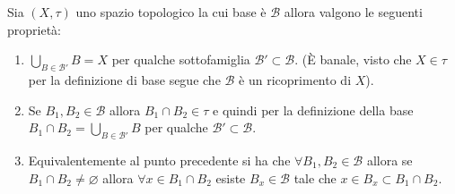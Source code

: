 \begin{remark}
	Sia $(X, \tau)$ uno spazio topologico la cui base è $\mathcal{B}$ allora valgono le seguenti proprietà:
	\begin{enumerate}
		\item $\bigcup_{B \in \mathcal{B}'} B = X$ per qualche sottofamiglia $\mathcal{B}' \subset \mathcal{B}$. (È banale, visto che $X \in \tau$ per la definizione di base segue che $\mathcal{B}$ è un ricoprimento di $X$).
		\item Se $B_1, B_2 \in \mathcal{B}$ allora $B_1 \cap B_2 \in \tau$ e quindi per la definizione della base $B_1 \cap B_2  = \bigcup_{B \in \mathcal{B}'} B$ per qualche $\mathcal{B}' \subset \mathcal{B}$.
		\item Equivalentemente al punto precedente si ha che $\forall B_1, B_2 \in \mathcal{B}$ allora se $B_1 \cap B_2 \neq \varnothing$ allora $\forall x \in B_1 \cap B_2$ esiste $B_x \in \mathcal{B}$ tale che $x \in B_x \subset B_1 \cap B_2$.
	\end{enumerate}
\end{remark}

